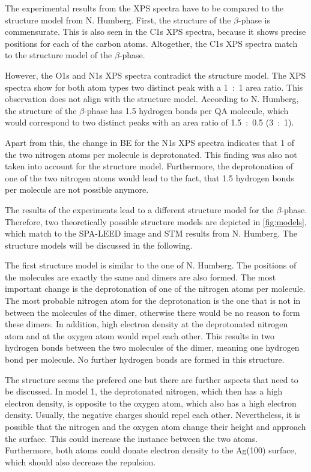The experimental results from the \ac{XPS} spectra have to be compared to the structure model from N. Humberg.\autocite{Humberg2024} First, the structure of the $\beta$-phase is commensurate. This is also seen in the C1s \ac{XPS} spectra, because it shows precise positions for each of the carbon atoms. Altogether, the C1s \ac{XPS} spectra match to the structure model of the $\beta$-phase.

However, the O1s and N1s \ac{XPS} spectra contradict the structure model. The \ac{XPS} spectra show for both atom types two distinct peak with a  1~:~1 area ratio. This observation does not align with the structure model. According to N. Humberg\autocite{Humberg2024}, the structure of the $\beta$-phase has 1.5 hydrogen bonds per \ac{QA} molecule, which would correspond to two distinct peaks with an area ratio of 1.5~:~0.5 (3~:~1).

Apart from this, the change in \ac{BE} for the N1s \ac{XPS} spectra indicates that 1 of the two nitrogen atoms per molecule is deprotonated. This finding was also not taken into account for the structure model. Furthermore, the deprotonation of one of the two nitrogen atoms would lead to the fact, that 1.5 hydrogen bonds per molecule are not possible anymore.

The results of the experiments lead to a different structure model for the $\beta$-phase. Therefore, two theoretically possible structure models are depicted in \autoref{fig:models}, which match to the SPA-LEED image and STM results from N. Humberg.\autocite{Humberg2024} The structure models will be discussed in the following.

The first structure model is similar to the one of N. Humberg.\autocite{Humberg2024} The positions of the molecules are exactly the same and dimers are also formed. The most important change is the deprotonation of one of the nitrogen atoms per molecule. The most probable nitrogen atom for the deprotonation is the one that is not in between the molecules of the dimer, otherwise there would be no reason to form these dimers. In addition, high electron density at the deprotonated nitrogen atom and at the oxygen atom would repel each other. This results in two hydrogen bonds between the two molecules of the dimer, meaning one hydrogen bond per molecule. No further hydrogen bonds are formed in this structure.

The structure seems the prefered one but there are further aspects that need to be discussed. In model 1, the deprotonated nitrogen, which then has a high electron density, is opposite to the oxygen atom, which also has a high electron density. Usually, the negative charges should repel each other. Nevertheless, it is possible that the nitrogen and the oxygen atom change their height and approach the surface. This could increase the instance between the two atoms. Furthermore, both atoms could donate electron density to the Ag(100) surface, which should also decrease the repulsion.

